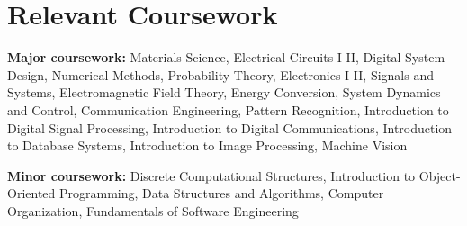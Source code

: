 \documentclass[letterpaper,11pt]{article}
\makeatletter
\newcommand{\resumeOrganizationHeading}[4]{
  \vspace{-2pt}\item
    \begin{tabular*}{0.97\textwidth}[t]{l@{\extracolsep{\fill}}r}
      \textbf{#1} & \textit{\small #2} \\
      \textit{\small#3}
    \end{tabular*}\vspace{-7pt}
}
\newcommand{\resumeSubHeadingListStart}{\begin{itemize}[leftmargin=0.15in, label={}]}
\newcommand{\resumeSubHeadingListEnd}{\end{itemize}}
\makeatother
\begin{document}
\section{Relevant Coursework}
  \vspace{2pt}
  \resumeSubHeadingListStart
    \small{\item{
        \textbf{Major coursework:}{ Materials Science, Electrical Circuits I-II, Digital System Design, Numerical Methods, Probability Theory, Electronics I-II, Signals and Systems, Electromagnetic Field Theory, Energy Conversion, System Dynamics and Control, Communication Engineering, Pattern Recognition, Introduction to Digital Signal Processing, Introduction to Digital Communications, Introduction to Database Systems, Introduction to Image Processing, Machine Vision} \\ \vspace{3pt}
        
        \textbf{Minor coursework:}{ Discrete Computational Structures, Introduction to Object-Oriented Programming, Data Structures and Algorithms, Computer Organization, Fundamentals of Software Engineering}
    }}
  \resumeSubHeadingListEnd




    
    




    
    



\end{document}
